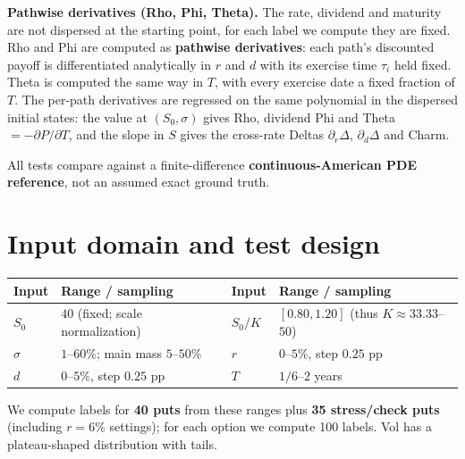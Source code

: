 \documentclass[10pt,letterpaper]{article}
\begin{document}
\textbf{Pathwise derivatives (Rho, Phi, Theta).} The rate, dividend and maturity
are not dispersed at the starting point, for each label we compute they are fixed. Rho and Phi are computed as \textbf{pathwise derivatives}: each path's discounted
payoff is differentiated analytically in $r$ and $d$ with its exercise time $\tau_i$ held fixed. Theta is computed
the same way in $T$, with every exercise date a fixed fraction of $T$.
The per-path derivatives are regressed on the same polynomial in the dispersed initial states: the
value at $(S_0,\sigma)$ gives Rho, dividend Phi and Theta $=-\partial P/\partial T$, and the slope in
$S$ gives the cross-rate Deltas $\partial_r\Delta$, $\partial_d\Delta$ and Charm.

All tests compare against a finite-difference \textbf{continuous-American PDE reference}, not an
assumed exact ground truth.

\section*{Input domain and test design}
\begin{center}
\begin{tabularx}{\linewidth}{@{}lXlX@{}}
\toprule
Input & Range / sampling & Input & Range / sampling\\
\midrule
$S_0$ & $40$ (fixed; scale normalization) & $S_0/K$ & $[0.80,1.20]$ (thus $K\approx33.33$--$50$)\\
$\sigma$ & $1$--$60\%$; main mass $5$--$50\%$ & $r$ & $0$--$5\%$, step $0.25$ pp\\
$d$ & $0$--$5\%$, step $0.25$ pp & $T$ & $1/6$--$2$ years\\
\bottomrule
\end{tabularx}
\end{center}
We compute labels for \textbf{40 puts} from these ranges
plus \textbf{35 stress/check puts} (including $r=6\%$ settings); for each option we compute
100 labels. Vol has a plateau-shaped distribution
with tails.
\end{document}
